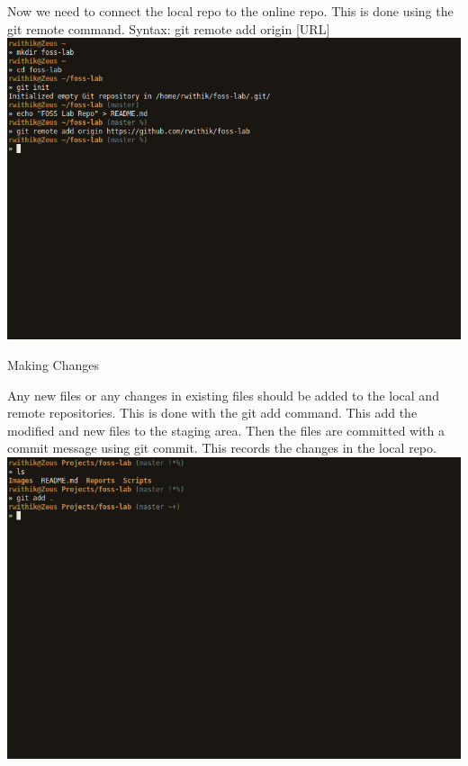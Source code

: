 \documentclass[10pt,a4paper,titlepage]{report}
\begin{document}
\par Now we need to connect the local repo to the  online repo. This is done using the {\color{red} git remote} command. \newline
Syntax: git remote add origin [URL] \newline\newline
\includegraphics[scale=.45]{../Images/VCS/2.png}
\begin{center}
\Large{Making Changes}
\end{center}
\vspace{.5cm}
\par Any new files or any changes in existing files should be added to the local and remote repositories. This is done with the {\color{red} git add} command. This add the modified and new files to the staging area. Then the files are committed with a commit message using {\color{red} git commit}. This records the changes in the local repo. \newline\newline
\includegraphics[scale=.45]{../Images/VCS/3.png}\newline\newline
\end{document}
